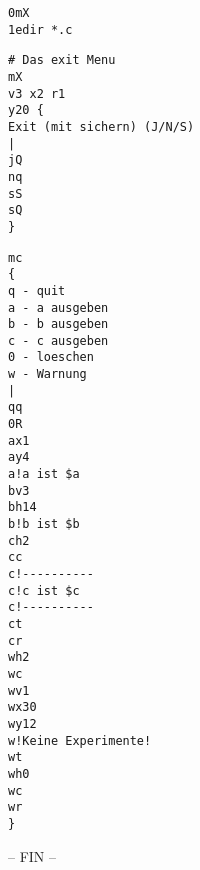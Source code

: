 \begin{verbatim}
0mX
1edir *.c
\end{verbatim}

\begin{verbatim}
# Das exit Menu
mX
v3 x2 r1
y20 {
Exit (mit sichern) (J/N/S)
|
jQ
nq
sS
sQ
}
\end{verbatim}

\begin{verbatim}
mc
{
q - quit
a - a ausgeben
b - b ausgeben
c - c ausgeben
0 - loeschen
w - Warnung
|
qq
0R
ax1
ay4
a!a ist $a
bv3
bh14
b!b ist $b
ch2
cc
c!----------
c!c ist $c
c!----------
ct
cr
wh2
wc
wv1
wx30
wy12
w!Keine Experimente!
wt
wh0
wc
wr
}
\end{verbatim}

\centerline{-- FIN --}



